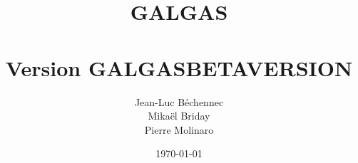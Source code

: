 \documentclass[a4paper, 11pt, openany]{book}
\begin{document}
 


\title{\Huge{\textbf{GALGAS}}\\~\\ \normalsize{Version GALGASBETAVERSION}}
\author{Jean-Luc Béchennec\\Mikaël Briday\\Pierre Molinaro}
\date \today 

\maketitle


\tableofcontents
 
\end{document}
